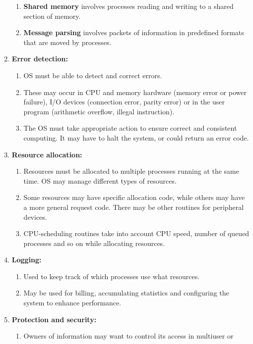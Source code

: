 \documentclass[journal,12pt,twocolumn]{IEEEtran}
\begin{document}
\begin{enumerate}
\begin{enumerate}
        \item \textbf{Shared memory} involves processes reading and writing to
        a shared section of memory.
        \item \textbf{Message parsing} involves packets of information in 
        predefined formats that are moved by processes.
    \end{enumerate}
    \item \textbf{Error detection:}
    \begin{enumerate}
        \item OS must be able to detect and correct errors. 
        \item These may occur in CPU and memory hardware (memory error or power 
        failure), I/O devices (connection error, parity error) or in the user 
        program (arithmetic overflow, illegal instruction).
        \item The OS must take appropriate action to ensure correct and 
        consistent computing. It may have to halt the system, or could return an 
        error code.
    \end{enumerate}
    \item \textbf{Resource allocation:}
    \begin{enumerate}
        \item Resources must be allocated to multiple processes running at the 
        same time. OS may manage different types of resources.
        \item Some resources may have specific allocation code, while others may
        have a more general request code. There may be other routines for 
        peripheral devices.
        \item CPU-scheduling routines take into account CPU speed, number of 
        queued processes and so on while allocating resources. 
    \end{enumerate}
    \item \textbf{Logging:}
    \begin{enumerate}
        \item Used to keep track of which processes use what resources.
        \item May be used for billing, accumulating statistics and configuring 
        the system to enhance performance.
    \end{enumerate}
    \item \textbf{Protection and security:}
    \begin{enumerate}
        \item Owners of information may want to control its access in multiuser or 

\end{enumerate}
\end{enumerate}
\end{document}
